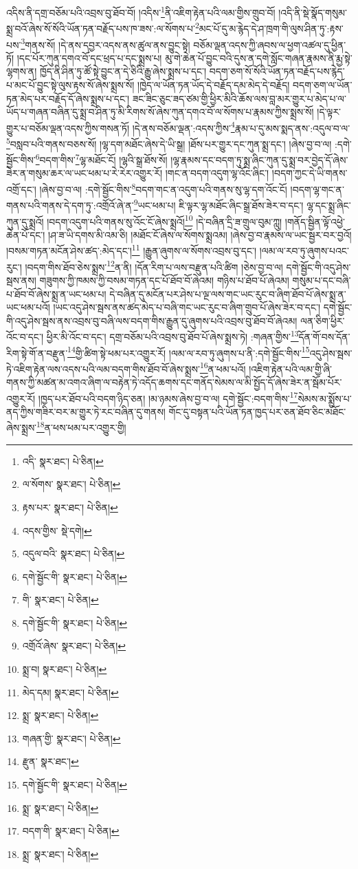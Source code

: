 འདིས་ནི་དགྲ་བཅོམ་པའི་འབྲས་བུ་ཐོབ་བོ། །འདིས་\footnote{འདི་  སྣར་ཐང་།  པེ་ཅིན། }ནི་འཇིག་རྟེན་པའི་ལམ་གྱིས་གྲུབ་བོ། །འདི་ནི་སྡེ་སྣོད་གསུམ་སྨྲ་བའོ་ཞེས་སོ་སོའི་ཡོན་ཏན་བརྗོད་པས་ཁ་ཟས་:ལ་སོགས་པ་\footnote{ལ་སོགས་  སྣར་ཐང་།  པེ་ཅིན། }མང་པོ་དུ་མ་རྙེད་དེ་ཤ་ཁྲག་གི་ལུས་ཤིན་ཏུ་:རྟས་པས་\footnote{རྟས་པར་  སྣར་ཐང་།  པེ་ཅིན། }གནས་སོ། །དེ་ནས་དབྱར་འདས་ནས་ཚུལ་ནས་བྱུང་སྟེ། བཅོམ་ལྡན་འདས་ཀྱི་ཞབས་ལ་ཕྱག་འཚལ་དུ་ཕྱིན་ཏོ། །དང་པོར་ཀུན་དགའ་བོ་དང་ཕྲད་པ་དང་སྨྲས་པ། མུ་གེ་ཆེན་པོ་བྱུང་བའི་དུས་ན་དགེ་སློང་གཞན་རྣམས་ནི་རྨྱ་སྟེ་ལྷགས་ན། ཁྱོད་ནི་ཤིན་ཏུ་ཚོ་སྟེ་བྱུང་ན་དེ་ཅིའི་རྒྱུ་ཞེས་སྨྲས་པ་དང་། བདག་ཅག་སོ་སོའི་ཡོན་ཏན་བརྗོད་པས་རྙེད་པ་མང་པོ་བྱུང་སྟེ་ལུས་རྟས་སོ་ཞེས་སྨྲས་སོ། །ཁྱེད་ལ་ཡོན་ཏན་ཡོད་དེ་བརྗོད་དམ་མེད་དེ་བརྗོད། བདག་ཅག་ལ་ཡོན་ཏན་མེད་པར་བརྗོད་དོ་ཞེས་སྨྲས་པ་དང་། ཟང་ཟིང་ཅུང་ཟད་ཙམ་གྱི་ཕྱིར་མིའི་ཆོས་ལས་བླ་མར་གྱུར་པ་མེད་པ་ལ་ཡོད་པ་གཞན་བཞིན་དུ་སྨྲ་བ་ཤིན་ཏུ་མི་རིགས་སོ་ཞེས་ཀུན་དགའ་བོ་ལ་སོགས་པ་རྣམས་ཀྱིས་སྨྲས་སོ། །དེ་ལྟར་གྱུར་པ་བཅོམ་ལྡན་འདས་ཀྱིས་གསན་ཏོ། །དེ་ནས་བཅོམ་ལྡན་:འདས་ཀྱིས་\footnote{འདས་གྱིས་  སྡེ་དགེ། }རྣམ་པ་དུ་མས་སྨད་ནས་:འདུལ་བ་ལ་\footnote{འདུལ་བའི་  སྣར་ཐང་།  པེ་ཅིན། }བསླབ་པའི་གནས་བཅས་སོ། །ལྷ་དག་མཐོང་ཞེས་དེ་ཡི་སྒྲ། །ཐོས་པར་གྱུར་དང་ཀུན་སྨྲ་དང་། །ཞེས་བྱ་བ་ལ། :དགེ་སྦྱོང་གིས་\footnote{དགེ་སྦྱོང་གི་  སྣར་ཐང་།  པེ་ཅིན། }བདག་གིས་\footnote{གི་  སྣར་ཐང་།  པེ་ཅིན། }ལྷ་མཐོང་ངོ། །ལྷའི་སྒྲ་ཐོས་སོ། །ལྷ་རྣམས་དང་བདག་ཏུ་སྨྲ་ཞིང་ཀུན་དུ་སྨྲ་བར་བྱེད་དོ་ཞེས་ཟེར་ན་གསུམ་ཆར་ལ་ཡང་ཕམ་པ་རེ་རེར་འགྱུར་རོ། །གང་ན་བདག་འདུག་ལྷ་འོང་ཞིང་། །བདག་ཀྱང་དེ་ཡི་གནས་འགྲོ་དང་། །ཞེས་བྱ་བ་ལ། :དགེ་སྦྱོང་གིས་\footnote{དགེ་སྦྱོང་གི་  སྣར་ཐང་།  པེ་ཅིན། }བདག་གང་ན་འདུག་པའི་གནས་སུ་ལྷ་དག་འོང་ངོ། །བདག་ལྷ་གང་ན་གནས་པའི་གནས་དེ་དག་ཏུ་:འགྲོའོ་ཞེ་ན་\footnote{འགྲོའོ་ཞེས་  སྣར་ཐང་།  པེ་ཅིན། }ཡང་ཕམ་པ། ཇི་ལྟར་ལྷ་མཐོང་ཞིང་སྒྲ་ཐོས་ཟེར་བ་དང་། ལྷ་དང་སྨྲ་ཞིང་ཀུན་དུ་སྨྲའོ། །བདག་འདུག་པའི་གནས་སུ་འོང་ངོ་ཞེས་སྨྲའོ།\footnote{སྨྲ་བ།  སྣར་ཐང་།  པེ་ཅིན། } །དེ་བཞིན་དྲི་ཟ་གྲུལ་བུམ་ཀླུ། །གནོད་སྦྱིན་ལྟོ་འཕྱེ་ཆེན་པོ་དང་། །ཤ་ཟ་ཡི་དགས་མི་འམ་ཅི། །མཐོང་ངོ་ཞེས་ལ་སོགས་སྨྲའམ། །ཞེས་བྱ་བ་རྣམས་ལ་ཡང་སྦྱར་བར་བྱའོ། །བསམ་གཏན་མངོན་ཤེས་ཚད་:མེད་དང་།\footnote{མེད་དམ།  སྣར་ཐང་།  པེ་ཅིན། } །རྒྱུན་ཞུགས་ལ་སོགས་འབྲས་བུ་དང་། །ལམ་ལ་རབ་ཏུ་ཞུགས་པའང་རུང་། །བདག་གིས་ཐོབ་ཅེས་སྨྲས་\footnote{སྨྲ་  སྣར་ཐང་།  པེ་ཅིན། }ན་ནི། །དོན་རིག་པ་ལས་བརྫུན་པའི་ཚིག །ཅེས་བྱ་བ་ལ། དགེ་སྦྱོང་གི་འདུ་ཤེས་སྦས་ནས། གཟུགས་ཀྱི་ཁམས་ཀྱི་བསམ་གཏན་དང་པོ་ཐོབ་བོ་ཞེའམ། གཉིས་པ་ཐོབ་པོ་ཞེའམ། གསུམ་པ་དང་བཞི་པ་ཐོབ་བོ་ཞེས་སྨྲ་ན་ཡང་ཕམ་པ། དེ་བཞིན་དུ་མངོན་པར་ཤེས་པ་ལྔ་ལས་གང་ཡང་རུང་བ་ཞིག་ཐོབ་པོ་ཞེས་སྨྲ་ན་ཡང་ཕམ་པའོ། །ཡང་འདུ་ཤེས་སྦས་ནས་ཚད་མེད་པ་བཞི་གང་ཡང་རུང་བ་ཞིག་གྲུབ་པོ་ཞེས་ཟེར་བ་དང་། དགེ་སྦྱོང་གི་འདུ་ཤེས་སྦས་ནས་འབྲས་བུ་བཞི་ལས་བདག་གིས་རྒྱུན་དུ་ཞུགས་པའི་འབྲས་བུ་ཐོབ་བོ་ཞེའམ། ལན་ཅིག་ཕྱིར་འོང་བ་དང་། ཕྱིར་མི་འོང་བ་དང་། དགྲ་བཅོམ་པའི་འབྲས་བུ་ཐོབ་པོ་ཞེས་སྨྲས་ཏེ། :གཞན་གྱིས་\footnote{གཞན་གྱི་  སྣར་ཐང་།  པེ་ཅིན། }དོན་གོ་བས་དོན་རིག་སྟེ་གོ་ན་བརྫུན་\footnote{རྫུན་  སྣར་ཐང་། }གྱི་ཚིག་སྟེ་ཕམ་པར་འགྱུར་རོ། །ལམ་ལ་རབ་ཏུ་ཞུགས་པ་ནི་:དགེ་སྦྱོང་གིས་\footnote{དགེ་སྦྱོང་གི་  སྣར་ཐང་།  པེ་ཅིན། }འདུ་ཤེས་སྦས་ཏེ་འཇིག་རྟེན་ལས་འདས་པའི་ལམ་བདག་གིས་ཐོབ་བོ་ཞེས་སྨྲས་\footnote{སྨྲ་  སྣར་ཐང་།  པེ་ཅིན། }ན་ཕམ་པའོ། །འཇིག་རྟེན་པའི་ལམ་གྱི་ཞི་གནས་ཀྱི་མཚན་མ་འགའ་ཞིག་ལ་བརྟེན་ཏེ་འདོད་ཆགས་དང་གནོད་སེམས་ལ་མི་སྤྱོད་དོ་ཞེས་ཟེར་ན་སྦོམ་པོར་འགྱུར་རོ། །ཁྱད་པར་ཐོབ་པའི་བདག་ཉིད་ཅན། །མ་ཉམས་ཞེས་བྱ་བ་ལ། དགེ་སྦྱོང་:བདག་གིས་\footnote{བདག་གི་  སྣར་ཐང་།  པེ་ཅིན། }སེམས་མ་སྨྱོས་པ་ནད་ཀྱིས་གཟིར་བར་མ་གྱུར་ཏེ་རང་བཞིན་དུ་གནས། གོང་དུ་བསྟན་པའི་ཡོན་ཏན་ཁྱད་པར་ཅན་ཐོབ་ཅིང་མཐོང་ཞེས་སྨྲས་\footnote{སྨྲ་  སྣར་ཐང་།  པེ་ཅིན། }ན་ཕས་ཕམ་པར་འགྱུར་གྱི། 